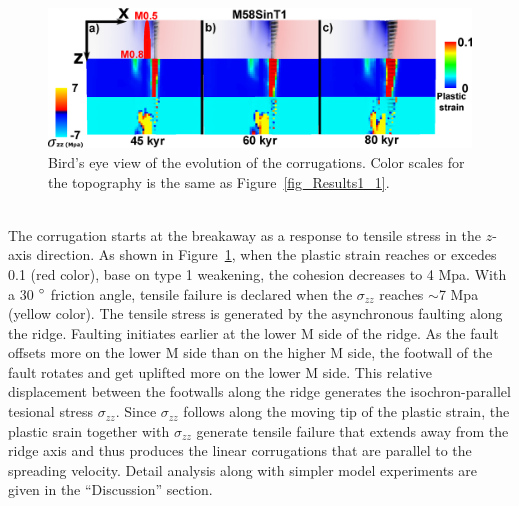 \begin{figure}[h]
  \centering
    \includegraphics[width=1.0\textwidth]{./Figures/fig_Results_3_2_6_corrugations_evolution.eps}
  \caption{Bird's eye view of the evolution of the corrugations. Color scales for the topography is the same as Figure~\hyperref[fig_Results1_1]{\ref{fig_Results1_1}}.}
 \label{fig_Results_3_2_6_corrugations_evolution}
\end{figure}

~\\
The corrugation starts at the breakaway as a response to tensile stress in the $z$-axis direction. As shown in Figure~\hyperref[fig_Results_3_2_6_corrugations_evolution]{\ref{fig_Results_3_2_6_corrugations_evolution}}, when the plastic strain reaches or excedes 0.1 (red color), base on type 1 weakening, the cohesion decreases to 4 Mpa. With a 30 $\degree$ friction angle, tensile failure is declared when the $\sigma_{zz}$ reaches $\sim$7 Mpa (yellow color).
The tensile stress is generated by the asynchronous faulting along the ridge. Faulting initiates earlier at the lower M side of the ridge. As the fault offsets more on the lower M side than on the higher M side, the footwall of the fault rotates and get uplifted more on the lower M side. This relative displacement between the footwalls along the ridge generates the isochron-parallel tesional stress $\sigma_{zz}$. Since $\sigma_{zz}$ follows along the moving tip of the plastic strain, the plastic srain together with $\sigma_{zz}$ generate tensile failure that extends away from the ridge axis and thus produces the linear corrugations that are parallel to the spreading velocity. Detail analysis along with simpler model experiments are given in the ``Discussion'' section.   

